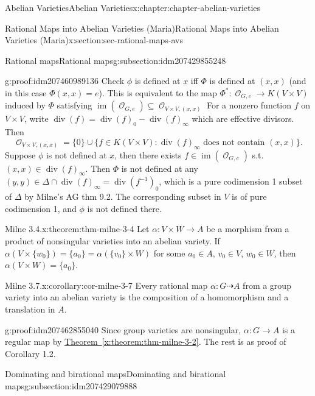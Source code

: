 \documentclass[oneside,10pt,]{book}
\numberwithin{equation}{section}
\newcommand{\sheaf}[1]{\operatorname{\mathcal{#1}}}
\DeclareMathOperator{\divisor}{div}
\DeclareMathOperator{\im}{im}
\begin{document}
\begin{chapterptx}{Abelian Varieties}{}{Abelian Varieties}{}{}{x:chapter:chapter-abelian-varieties}
\begin{sectionptx}{Rational Maps into Abelian Varieties (Maria)}{}{Rational Maps into Abelian Varieties (Maria)}{}{}{x:section:sec-rational-maps-avs}
\begin{subsectionptx}{Rational maps}{}{Rational maps}{}{}{g:subsection:idm207429855248}
\begin{proofptx}{}{g:proof:idm207460989136}
Check \(\phi\) is defined at \(x\) iff \(\Phi\) is defined at \((x,x)\) (and in this case \(\Phi(x,x) = e\)). This is equivalent to the map \(\Phi^*\colon \sheaf O_{G,e} \to K(V\times V)\) induced by  \(\Phi\) satisfying   \(\im(\sheaf O_{G,e}) \subseteq \sheaf O_{V\times V, (x,x)}\) For a nonzero function \(f\) on \(V\times V\), write \(\divisor(f) = \divisor(f)_0 - \divisor(f)_\infty\) which are effective divisors. Then%
\begin{equation*}
\sheaf O_{V\times V, (x,x)} = \{0\} \cup \{f\in K(V\times V) : \divisor(f)_\infty \text{ does not contain }(x,x)\}\text{.}
\end{equation*}
Suppose \(\phi\) is not defined at \(x\), then there exists \(f\in \im(\sheaf O_{G,e})\) s.t. \((x,x) \in \divisor(f)_\infty\). Then \(\Phi\) is not defined at any \((y,y) \in \Delta \cap  \divisor(f)_\infty = \divisor(f^{-1})_0\), which is a pure codimension 1 subset of \(\Delta\) by Milne's AG thm 9.2. The corresponding subset in \(V\) is of pure codimension 1, and \(\phi\) is not defined there.%
\end{proofptx}
\begin{theorem}{Milne 3.4.}{}{x:theorem:thm-milne-3-4}%
Let \(\alpha \colon V \times W \to A\) be a morphism from a product of nonsingular varieties into an abelian variety. If \(\alpha (V\times\{w_0\}) = \{a_0 \} =  \alpha(\{v_0 \}\times W)\) for some \(a_0 \in A\), \(v_0\in V\), \(w_0 \in W\), then \(\alpha(V\times W) = \{a_0\}\).%
\end{theorem}
\begin{corollary}{Milne 3.7.}{}{x:corollary:cor-milne-3-7}%
Every rational map \(\alpha \colon G\dashrightarrow A\) from a group variety into an abelian variety is the composition of a homomorphism and a translation in \(A\).%
\end{corollary}
\begin{proofptx}{}{g:proof:idm207462855040}
Since group varieties are nonsingular, \(\alpha\colon G \to A\) is a regular map by \hyperref[x:theorem:thm-milne-3-2]{Theorem~\ref{x:theorem:thm-milne-3-2}}. The rest is as proof of Corollary 1.2.%
\end{proofptx}
\end{subsectionptx}
%
%
\typeout{************************************************}
\typeout{************************************************}
%
\begin{subsectionptx}{Dominating and birational maps}{}{Dominating and birational maps}{}{}{g:subsection:idm207429079888}

\end{subsectionptx}
\end{sectionptx}
\end{chapterptx}
\end{document}
